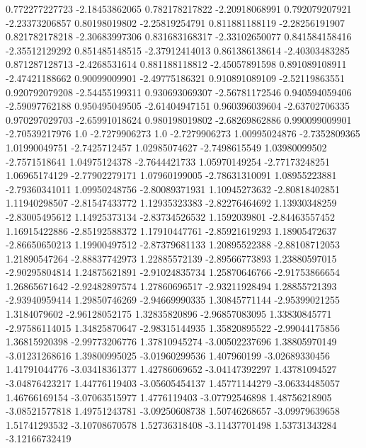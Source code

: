  0.772277227723   -2.18453862065
 0.782178217822   -2.20918068991
 0.792079207921   -2.23373206857
  0.80198019802   -2.25819254791
 0.811881188119   -2.28256191907
 0.821782178218   -2.30683997306
 0.831683168317   -2.33102650077
 0.841584158416   -2.35512129292
 0.851485148515   -2.37912414013
 0.861386138614   -2.40303483285
 0.871287128713    -2.4268531614
 0.881188118812   -2.45057891598
 0.891089108911   -2.47421188662
  0.90099009901   -2.49775186321
 0.910891089109   -2.52119863551
 0.920792079208   -2.54455199311
 0.930693069307   -2.56781172546
 0.940594059406   -2.59097762188
 0.950495049505   -2.61404947151
 0.960396039604   -2.63702706335
 0.970297029703   -2.65991018624
 0.980198019802   -2.68269862886
 0.990099009901   -2.70539217976
            1.0    -2.7279906273
            1.0    -2.7279906273
  1.00995024876    -2.7352809365
  1.01990049751    -2.7425712457
  1.02985074627    -2.7498615549
  1.03980099502    -2.7571518641
  1.04975124378    -2.7644421733
  1.05970149254   -2.77173248251
  1.06965174129   -2.77902279171
  1.07960199005   -2.78631310091
  1.08955223881   -2.79360341011
  1.09950248756   -2.80089371931
  1.10945273632   -2.80818402851
  1.11940298507   -2.81547433772
  1.12935323383   -2.82276464692
  1.13930348259   -2.83005495612
  1.14925373134   -2.83734526532
   1.1592039801   -2.84463557452
  1.16915422886   -2.85192588372
  1.17910447761   -2.85921619293
  1.18905472637   -2.86650650213
  1.19900497512   -2.87379681133
  1.20895522388   -2.88108712053
  1.21890547264   -2.88837742973
  1.22885572139   -2.89566773893
  1.23880597015   -2.90295804814
  1.24875621891   -2.91024835734
  1.25870646766   -2.91753866654
  1.26865671642   -2.92482897574
  1.27860696517   -2.93211928494
  1.28855721393   -2.93940959414
  1.29850746269   -2.94669990335
  1.30845771144   -2.95399021255
   1.3184079602   -2.96128052175
  1.32835820896   -2.96857083095
  1.33830845771   -2.97586114015
  1.34825870647   -2.98315144935
  1.35820895522   -2.99044175856
  1.36815920398   -2.99773206776
  1.37810945274   -3.00502237696
  1.38805970149   -3.01231268616
  1.39800995025   -3.01960299536
    1.407960199   -3.02689330456
  1.41791044776   -3.03418361377
  1.42786069652   -3.04147392297
  1.43781094527   -3.04876423217
  1.44776119403   -3.05605454137
  1.45771144279   -3.06334485057
  1.46766169154   -3.07063515977
   1.4776119403   -3.07792546898
  1.48756218905   -3.08521577818
  1.49751243781   -3.09250608738
  1.50746268657   -3.09979639658
  1.51741293532   -3.10708670578
  1.52736318408   -3.11437701498
  1.53731343284   -3.12166732419
